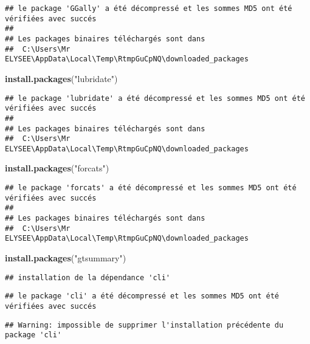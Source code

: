 \documentclass[
]{article}
\newenvironment{Shaded}{\begin{snugshade}}{\end{snugshade}}
\newcommand{\FunctionTok}[1]{\textcolor[rgb]{0.13,0.29,0.53}{\textbf{#1}}}
\newcommand{\NormalTok}[1]{#1}
\newcommand{\StringTok}[1]{\textcolor[rgb]{0.31,0.60,0.02}{#1}}
\begin{document}
\begin{verbatim}
## le package 'GGally' a été décompressé et les sommes MD5 ont été vérifiées avec succés
## 
## Les packages binaires téléchargés sont dans
##  C:\Users\Mr ELYSEE\AppData\Local\Temp\RtmpGuCpNQ\downloaded_packages
\end{verbatim}

\begin{Shaded}
\begin{Highlighting}[]
\FunctionTok{install.packages}\NormalTok{(}\StringTok{"lubridate"}\NormalTok{)}
\end{Highlighting}
\end{Shaded}

\begin{verbatim}
## le package 'lubridate' a été décompressé et les sommes MD5 ont été vérifiées avec succés
## 
## Les packages binaires téléchargés sont dans
##  C:\Users\Mr ELYSEE\AppData\Local\Temp\RtmpGuCpNQ\downloaded_packages
\end{verbatim}

\begin{Shaded}
\begin{Highlighting}[]
\FunctionTok{install.packages}\NormalTok{(}\StringTok{"forcats"}\NormalTok{)}
\end{Highlighting}
\end{Shaded}

\begin{verbatim}
## le package 'forcats' a été décompressé et les sommes MD5 ont été vérifiées avec succés
## 
## Les packages binaires téléchargés sont dans
##  C:\Users\Mr ELYSEE\AppData\Local\Temp\RtmpGuCpNQ\downloaded_packages
\end{verbatim}

\begin{Shaded}
\begin{Highlighting}[]
\FunctionTok{install.packages}\NormalTok{(}\StringTok{"gtsummary"}\NormalTok{)}
\end{Highlighting}
\end{Shaded}

\begin{verbatim}
## installation de la dépendance 'cli'
\end{verbatim}

\begin{verbatim}
## le package 'cli' a été décompressé et les sommes MD5 ont été vérifiées avec succés
\end{verbatim}

\begin{verbatim}
## Warning: impossible de supprimer l'installation précédente du package 'cli'
\end{verbatim}
\end{document}
